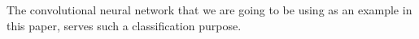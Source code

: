 The convolutional neural network that we are going to be using as an example in this paper, serves such a classification purpose.

\startsubsection[title=Traning a neural network with a cost function]

\stopsubsection

\startsubsection[title=Optimization]

\stopsubsection

\startsubsection[title=Forward and backward propoagation]

\stopsubsection

\stopsection

\stopsection